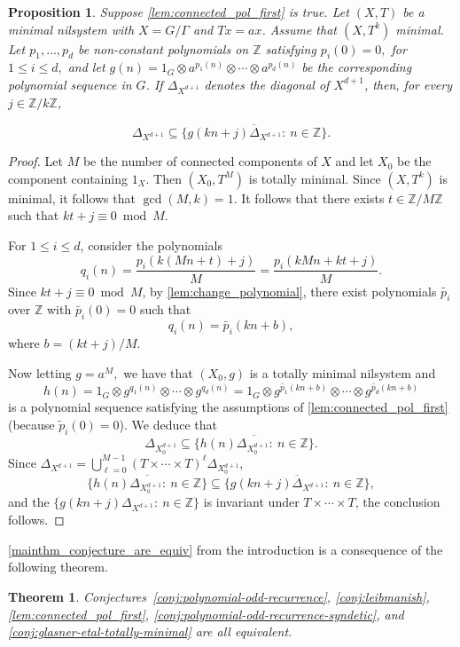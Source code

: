 \documentclass{article}
\theoremstyle{plain}
\newtheorem{theorem}[Theorem]{Theorem}
\newtheorem{Proposition}[Theorem]{Proposition}
\theoremstyle{claim}
\theoremstyle{definition}
\theoremstyle{plain}
\theoremstyle{plain}
\newcommand{\Z}{\mathbb{Z}}
\renewcommand{\leq}{\leqslant}
\newcommand{\1}{\boldsymbol{1}}
\begin{document}
\begin{Proposition}
\label{thm:main_nil_pol}
Suppose \cref{lem:connected_pol_first} is true. Let $(X,T)$ be a minimal nilsystem with $X = G/\Gamma$ and $Tx = ax$. 
Assume that  $(X,T^k)$ minimal. 
Let $p_1, \ldots, p_d$ be non-constant polynomials on $\Z$ satisfying $p_i(0) = 0,$ for $1\leq i\leq d,$ and let $g(n) = 1_G \otimes a^{p_1(n)} \otimes \cdots \otimes a^{p_d(n)}$ be the corresponding polynomial sequence in $G$. 
If $\Delta_{X^{d+1}}$ denotes the diagonal of $X^{d+1}$, then, for every $j \in \Z/k\Z$,

\[
    \Delta_{X^{d+1}} \subseteq \overline{\{g(kn + j) \Delta_{X^{d+1}}: \ n \in \Z\}}.
\]
\end{Proposition}
\begin{proof}
Let $M$ be the number of connected components of $X$ and let $X_0$ be the component containing $1_X$. 
Then $(X_0, T^M)$ is totally minimal. 
Since $(X,T^k)$ is minimal, it follows that $\gcd(M, k) = 1$. 
It follows that there exists $t \in \Z/M\Z$ such that $kt + j \equiv 0 \bmod M$.



For $1\leq i \leq d$, consider the polynomials
\[
    q_i(n) = \frac{p_i(k(Mn + t) + j)}{M} = \frac{p_i(kMn + kt + j)}{M}.
\]
Since $kt + j \equiv 0 \bmod M$, by \cref{lem:change_polynomial}, there exist polynomials $\tilde{p_i}$ over $\Z$ with $\tilde{p_i}(0) = 0$ such that 
\[
    q_i(n) = \tilde{p_i}(kn + b),
\]
where $b = (kt + j)/M$.

Now letting $g=a^M,$ we have that $(X_0, g)$ is a totally minimal nilsystem and 
\[
    h(n) = 1_G \otimes g^{q_1(n)} \otimes \cdots \otimes g^{q_d(n)} = 1_G \otimes g^{\tilde{p_1}(kn + b)} \otimes \cdots \otimes g^{\tilde{p_d}(kn + b)}
\]
is a polynomial sequence satisfying the assumptions of \cref{lem:connected_pol_first} (because $\tilde p_i(0)=0$).
We deduce that
\[
    \Delta_{X_0^{d+1}} \subseteq \overline{\{h(n) \Delta_{X_0^{d+1}}: \ n \in \Z\}}.
\]
Since $\Delta_{X^{d+1}} =\bigcup_{\ell=0}^{M-1}(T\times\cdots\times T)^\ell\Delta_{X_0^{d+1}}$, 
\[
    \overline{\{h(n) \Delta_{X_0^{d+1}}: \ n \in \Z\}} \subseteq \overline{\{g(kn + j) \Delta_{X^{d+1}}: \ n \in \Z\}},
\]
and the $\{g(kn + j) \Delta_{X^{d+1}}: \ n \in \Z\}$ is invariant under $T\times\cdots\times T$, the conclusion follows.
\end{proof}

\cref{mainthm_conjecture_are_equiv} from the introduction is a consequence of the following theorem.

\begin{theorem}
\label{thm:all_conjectures_equivalent}
Conjectures~\ref{conj:polynomial-odd-recurrence}, \ref{conj:leibmanish}, \ref{lem:connected_pol_first}, \ref{conj:polynomial-odd-recurrence-syndetic}, and \ref{conj:glasner-etal-totally-minimal} are all equivalent.
\end{theorem}
\end{document}
